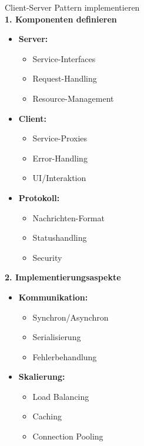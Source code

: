 \begin{KR}{Client-Server Pattern implementieren}\\
\textbf{1. Komponenten definieren}
\begin{itemize}
    \item \textbf{Server:}
    \begin{itemize}
        \item Service-Interfaces
        \item Request-Handling
        \item Resource-Management
    \end{itemize}
    
    \item \textbf{Client:}
    \begin{itemize}
        \item Service-Proxies
        \item Error-Handling
        \item UI/Interaktion
    \end{itemize}
    
    \item \textbf{Protokoll:}
    \begin{itemize}
        \item Nachrichten-Format
        \item Statushandling
        \item Security
    \end{itemize}
\end{itemize}

\textbf{2. Implementierungsaspekte}
\begin{itemize}
    \item \textbf{Kommunikation:}
    \begin{itemize}
        \item Synchron/Asynchron
        \item Serialisierung
        \item Fehlerbehandlung
    \end{itemize}
    
    \item \textbf{Skalierung:}
    \begin{itemize}
        \item Load Balancing
        \item Caching
        \item Connection Pooling
    \end{itemize}
\end{itemize}
\end{KR}

